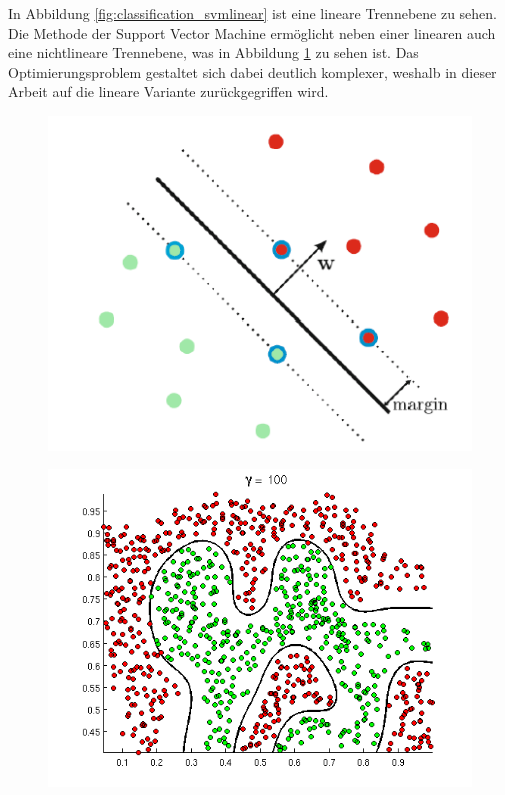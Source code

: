 In Abbildung \ref{fig:classification_svmlinear} ist eine lineare Trennebene zu sehen. Die Methode der Support Vector Machine erm\"oglicht neben einer linearen auch eine nichtlineare Trennebene, was in Abbildung \ref{fig:classification_svmnonlinear} zu sehen ist. Das Optimierungsproblem gestaltet sich dabei deutlich komplexer, weshalb in dieser Arbeit auf die lineare Variante zur\"uckgegriffen wird.

\begin{figure}
\centering
\begin{minipage}{.5\textwidth}
  \centering
  \includegraphics[width=1\textwidth]{media/classification/svm_linear.png}
  \label{fig:classification_svmlinear}
\end{minipage}%
\begin{minipage}{.5\textwidth}
  \centering
  \includegraphics[width=1\textwidth]{media/classification/svm_nonlinear.png}
  \label{fig:classification_svmnonlinear}
\end{minipage}
\end{figure}
